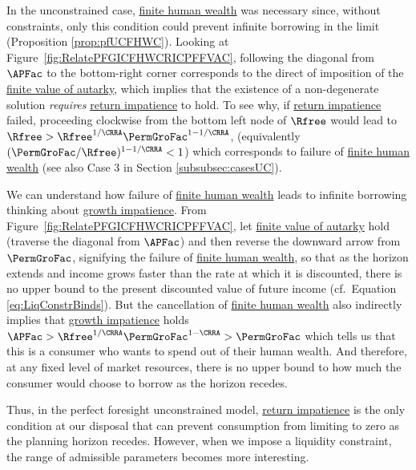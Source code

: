 \documentclass[BufferStockTheory]{subfiles}
\begin{document}
In the unconstrained case, \hyperlink{FHWC}{finite human wealth} was necessary since, without constraints, only  this condition could prevent infinite borrowing in the limit (Proposition \ref{prop:pfUCFHWC}).
Looking at Figure~\ref{fig:RelatePFGICFHWCRICPFFVAC}, following the diagonal from $\APFac$ to the bottom-right corner corresponds to the direct of imposition of the \hyperlink{PFFVAC}{finite value of autarky}, which implies that the existence of a non-degenerate solution \textit{requires} \hyperlink{RIC}{return impatience} to hold.
To see why, if \hyperlink{RIC}{return impatience} failed, proceeding clockwise from the bottom left node of $\Rfree$ would lead to $\Rfree> \Rfree^{1/\CRRA}\PermGroFac^{1-1/\CRRA}$, (equivalently $(\PermGroFac/\Rfree)^{1-{1/\CRRA}}<1$) which corresponds to failure of \hyperlink{FHWC}{finite human wealth} (see also Case 3 in Section \ref{subsubsec:casesUC}).


We can understand how failure of \hyperlink{FHWC}{finite human wealth} leads to infinite borrowing thinking about \hyperlink{GIC}{growth impatience}.
From Figure~\ref{fig:RelatePFGICFHWCRICPFFVAC}, let \hyperlink{PFFVAC}{finite value of autarky} hold (traverse the diagonal from $\APFac$)  and then reverse the downward arrow from $\PermGroFac$, signifying the failure of \hyperlink{FHWC}{finite human wealth}, so that as the horizon extends and income grows faster than the rate at which it is discounted, there is no upper bound to the present discounted value of future income (cf.\ Equation \eqref{eq:LiqConstrBinds}).
But the cancellation of \hyperlink{FHWC}{finite human wealth} also indirectly implies that \hyperlink{GIC}{growth impatience} holds $\APFac > \Rfree^{1/\CRRA}\PermGroFac^{1-\CRRA} > \PermGroFac$ which tells us that this is a consumer who wants to spend out of their human wealth.
And therefore, at any fixed level of market resources, there is no upper bound to how much the consumer would choose to borrow as the horizon recedes.


\begin{comment}
An argument similar to the discussion pertaining to Equation \eqref{eq:LiqConstrBinds}, \textit{any} arbitrarily low (negative) constraint on $\bNrm_{t}$ becomes relevant.
Relaxing any constraint becomes always preferred and since income is guaranteed to grow faster than the rate of return, the consumer can continue to borrow without violating the no-ponzi condition (Equation \eqref{eq:NoDebtAtDeath}).
\end{comment}

Thus, in the perfect foresight unconstrained model, \hyperlink{RIC}{return impatience} is the only condition at our disposal that can prevent consumption from limiting to zero as the planning horizon recedes.
However, when we impose a liquidity constraint, the range of admissible parameters becomes more interesting.
\end{document}
